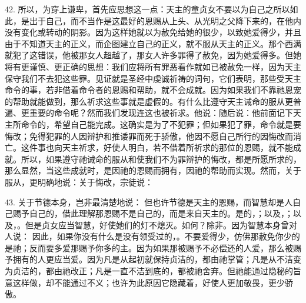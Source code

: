 42. 所以，为穿上谦卑，首先应思想这一点：天主的童贞女不要以为自己之所以如此，是出于自己，而不当作是这最好的恩赐从上头、从光明之父降下来的，在他内没有变化或转动的阴影。因为这样她就以为赦免给她的很少，以致她爱得少，并且由于不知道天主的正义，而企图建立自己的正义，就不服从天主的正义。那个西满就犯了这错误，他被那女人超越了，那女人许多罪得了赦免，因为她爱得多。但她将有更谨慎、更正确的思想：我们应将所有罪恶看作就如已被赦免一样，因为天主保守我们不去犯这些罪。见证就是圣经中虔诚祈祷的词句，它们表明，那些受天主命令的事，若非借着命令者的恩赐和帮助，就不会成就。因为如果我们不靠祂恩宠的帮助就能做到，那么祈求这些事就是虚假的。有什么比遵守天主诫命的服从更普遍、更重要的命令呢？然而我们发现连这也被祈求。他说：随后说：他前面记下天主所命令的，希望自己能完成。这确实是为了不犯罪；但如果犯了罪，命令就是要悔改；免得犯罪的人因辩护和推诿罪而死于骄傲，他因不愿自己所行的因悔改而消亡。这件事也向天主祈求，好使人明白，若不借着所祈求的那位的恩赐，就不能成就。所以，如果遵守祂诫命的服从和使我们不为罪辩护的悔改，都是所愿所求的，那么显然，当这些成就时，是因祂的恩赐而拥有，因祂的帮助而实现。然而，关于服从，更明确地说：关于悔改，宗徒说：\par

43. 关于节德本身，岂非最清楚地说： 但也许节德是天主的恩赐，而智慧却是人自己赐予自己的，借此理解那恩赐不是自己的，而是来自天主的。是的，；以及，；以及，。但是贞女应当智慧，好使她们的灯不熄灭。如何？除非。因为智慧本身曾对人说： 因此，如果你没有什么是没有领受过的，。不要爱得少，仿佛那赦免你少的是祂；反而要多爱那赐予你多的主。因为如果那被赐予不必偿还的人爱，那么被赐予拥有的人更应当爱。因为凡是从起初就保持贞洁的，都由祂掌管；凡是从不洁变为贞洁的，都由祂改正；凡是一直不洁到底的，都被祂舍弃。但祂能通过隐秘的旨意这样做，却不能通过不义；也许为此原因它隐藏着，好使人更加敬畏，更少骄傲。\par

